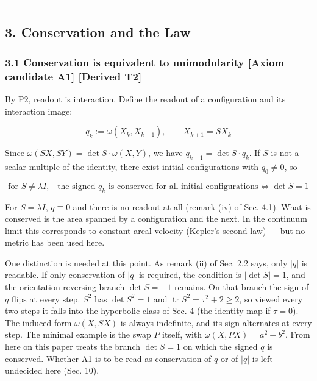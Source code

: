 \documentclass[
  a4paper,
]{article}
\begin{document}
\begin{center}\rule{0.5\linewidth}{0.5pt}\end{center}

\subsection{3. Conservation and the Law}\label{conservation-and-the-law}

\subsubsection{3.1 Conservation is equivalent to unimodularity {[}Axiom
candidate A1{]} {[}Derived
T2{]}}\label{conservation-is-equivalent-to-unimodularity-axiom-candidate-a1-derived-t2}

By P2, readout is interaction. Define the readout of a configuration and
its interaction image:

\[
q_k:=\omega(X_k,X_{k+1}),\qquad X_{k+1}=SX_k
\]

Since \(\omega(SX,SY)=\det S\cdot\omega(X,Y)\), we have
\(q_{k+1}=\det S\cdot q_k\). If \(S\) is not a scalar multiple of the
identity, there exist initial configurations with \(q_0\neq0\), so

\[
\boxed{\;\text{for }S\neq\lambda I\text{,}\quad\text{the signed }q_k\text{ is conserved for all initial configurations}\iff\det S=1\;}
\]

For \(S=\lambda I\), \(q\equiv0\) and there is no readout at all (remark
(iv) of Sec. 4.1). What is conserved is the area spanned by a
configuration and the next. In the continuum limit this corresponds to
constant areal velocity (Kepler's second law) --- but no metric has been
used here.

One distinction is needed at this point. As remark (ii) of Sec. 2.2
says, only \(\lvert q\rvert\) is readable. If only conservation of
\(\lvert q\rvert\) is required, the condition is
\(\lvert\det S\rvert=1\), and the orientation-reversing branch
\(\det S=-1\) remains. On that branch the sign of \(q\) flips at every
step. \(S^2\) has \(\det S^2=1\) and
\(\operatorname{tr}S^2=\tau^2+2\ge2\), so viewed every two steps it
falls into the hyperbolic class of Sec. 4 (the identity map if
\(\tau=0\)). The induced form \(\omega(X,SX)\) is always indefinite, and
its sign alternates at every step. The minimal example is the swap \(P\)
itself, with \(\omega(X,PX)=a^2-b^2\). From here on this paper treats
the branch \(\det S=1\) on which the signed \(q\) is conserved. Whether
A1 is to be read as conservation of \(q\) or of \(\lvert q\rvert\) is
left undecided here (Sec. 10).
\end{document}
